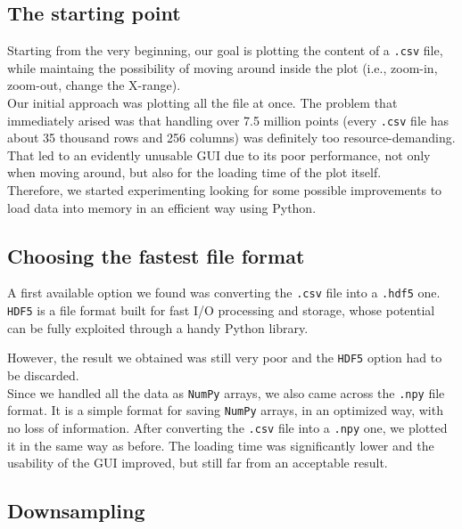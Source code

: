 \documentclass[11pt,a4paper]{article}
\begin{document}
\subsection{The starting point}

Starting from the very beginning, our goal is plotting the content of a \texttt{.csv} file, while maintaing the possibility of moving around inside the plot (i.e., zoom-in, zoom-out, change the X-range).\\

Our initial approach was plotting all the file at once. The problem that immediately arised was that handling over 7.5 million points (every \texttt{.csv} file has about 35 thousand rows and 256 columns) was definitely too resource-demanding. That led to an evidently unusable GUI due to its poor performance, not only when moving around, but also for the loading time of the plot itself.\\

Therefore, we started experimenting looking for some possible improvements to load data into memory in an efficient way using Python.\\

\subsection{Choosing the fastest file format}

A first available option we found was converting the \texttt{.csv} file into a \texttt{.hdf5} one. \texttt{HDF5} is a file format built for fast I/O processing and storage, whose potential can be fully exploited through a handy Python library.

However, the result we obtained was still very poor and the \texttt{HDF5} option had to be discarded.\\

Since we handled all the data as \texttt{NumPy} arrays, we also came across the \texttt{.npy} file format. It is a simple format for saving \texttt{NumPy} arrays, in an optimized way, with no loss of information.
After converting the \texttt{.csv} file into a \texttt{.npy} one, we plotted it in the same way as before. The loading time was significantly lower and the usability of the GUI improved, but still far from an acceptable result.\\

\subsection{Downsampling}
\end{document}
